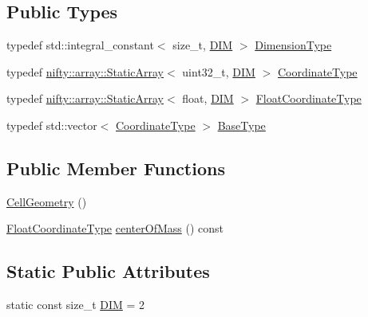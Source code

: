 \subsection*{Public Types}
\begin{DoxyCompactItemize}
\item 
typedef std\+::integral\+\_\+constant$<$ size\+\_\+t, \hyperlink{classnifty_1_1cgp_1_1CellGeometry_3_012_00_011_01_4_a42d125e23384bc4a770893276750d9d1}{D\+IM} $>$ \hyperlink{classnifty_1_1cgp_1_1CellGeometry_3_012_00_011_01_4_a35fae8ad3031bc0765ecb4d56cbff171}{Dimension\+Type}
\item 
typedef \hyperlink{namespacenifty_1_1array_a683f151f19c851754e0c6d55ed16a0c2}{nifty\+::array\+::\+Static\+Array}$<$ uint32\+\_\+t, \hyperlink{classnifty_1_1cgp_1_1CellGeometry_3_012_00_011_01_4_a42d125e23384bc4a770893276750d9d1}{D\+IM} $>$ \hyperlink{classnifty_1_1cgp_1_1CellGeometry_3_012_00_011_01_4_a61e8ffb089e3ca4bf7998e77dfc278bc}{Coordinate\+Type}
\item 
typedef \hyperlink{namespacenifty_1_1array_a683f151f19c851754e0c6d55ed16a0c2}{nifty\+::array\+::\+Static\+Array}$<$ float, \hyperlink{classnifty_1_1cgp_1_1CellGeometry_3_012_00_011_01_4_a42d125e23384bc4a770893276750d9d1}{D\+IM} $>$ \hyperlink{classnifty_1_1cgp_1_1CellGeometry_3_012_00_011_01_4_aa894ce050b43284dac01b3963e2e1e47}{Float\+Coordinate\+Type}
\item 
typedef std\+::vector$<$ \hyperlink{classnifty_1_1cgp_1_1CellGeometry_3_012_00_011_01_4_a61e8ffb089e3ca4bf7998e77dfc278bc}{Coordinate\+Type} $>$ \hyperlink{classnifty_1_1cgp_1_1CellGeometry_3_012_00_011_01_4_a10f7d7a27ef9080c3a94fc69a258c55e}{Base\+Type}
\end{DoxyCompactItemize}
\subsection*{Public Member Functions}
\begin{DoxyCompactItemize}
\item 
\hyperlink{classnifty_1_1cgp_1_1CellGeometry_3_012_00_011_01_4_ae525aaf64790b4c76c17208a13588101}{Cell\+Geometry} ()
\item 
\hyperlink{classnifty_1_1cgp_1_1CellGeometry_3_012_00_011_01_4_aa894ce050b43284dac01b3963e2e1e47}{Float\+Coordinate\+Type} \hyperlink{classnifty_1_1cgp_1_1CellGeometry_3_012_00_011_01_4_a45e1e4a17ac344f11cbe4f96796defe8}{center\+Of\+Mass} () const
\end{DoxyCompactItemize}
\subsection*{Static Public Attributes}
\begin{DoxyCompactItemize}
\item 
static const size\+\_\+t \hyperlink{classnifty_1_1cgp_1_1CellGeometry_3_012_00_011_01_4_a42d125e23384bc4a770893276750d9d1}{D\+IM} = 2
\end{DoxyCompactItemize}
